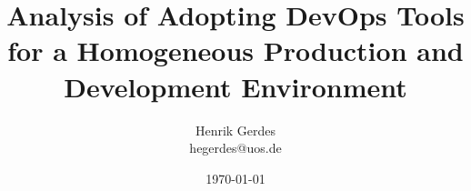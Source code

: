 

\title[Development with DevContainers]{Analysis of Adopting DevOps Tools for a Homogeneous Production and Development Environment}

\author[Henrik Gerdes]{Henrik Gerdes\\ {\scriptsize hegerdes@uos.de}}

\date{\today}